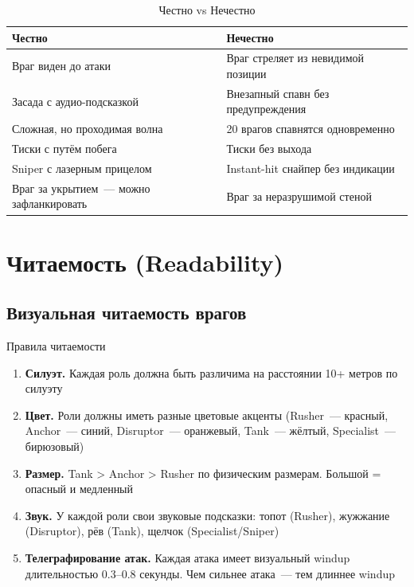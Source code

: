 \documentclass[a4paper,11pt]{report}
\begin{document}
\begin{table}[H]
\centering
\caption{Честно vs Нечестно}
\begin{tabularx}{\textwidth}{@{}XX@{}}
\toprule
\textbf{Честно} & \textbf{Нечестно} \\
\midrule
Враг виден до атаки & Враг стреляет из невидимой позиции \\
Засада с аудио-подсказкой & Внезапный спавн без предупреждения \\
Сложная, но проходимая волна & 20 врагов спавнятся одновременно \\
Тиски с путём побега & Тиски без выхода \\
Sniper с лазерным прицелом & Instant-hit снайпер без индикации \\
Враг за укрытием~--- можно зафланкировать & Враг за неразрушимой стеной \\
\bottomrule
\end{tabularx}
\end{table}

\section{Читаемость (Readability)}

\subsection{Визуальная читаемость врагов}

\begin{rulebox}{Правила читаемости}
\begin{enumerate}[leftmargin=*]
  \item \textbf{Силуэт.} Каждая роль должна быть различима
    на расстоянии 10+ метров по силуэту
  \item \textbf{Цвет.} Роли должны иметь разные цветовые акценты
    (Rusher~--- красный, Anchor~--- синий, Disruptor~--- оранжевый,
    Tank~--- жёлтый, Specialist~--- бирюзовый)
  \item \textbf{Размер.} Tank > Anchor > Rusher по физическим размерам.
    Большой = опасный и медленный
  \item \textbf{Звук.} У каждой роли свои звуковые подсказки:
    топот (Rusher), жужжание (Disruptor), рёв (Tank),
    щелчок (Specialist/Sniper)
  \item \textbf{Телеграфирование атак.} Каждая атака имеет
    визуальный windup длительностью 0.3--0.8 секунды.
    Чем сильнее атака~--- тем длиннее windup
\end{enumerate}
\end{rulebox}
\end{document}
